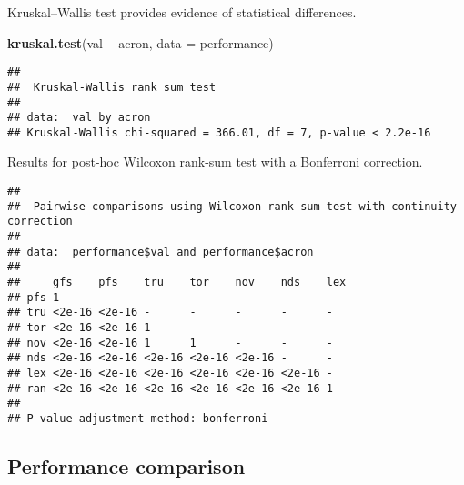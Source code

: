 \documentclass[]{book}
\newenvironment{Shaded}{\begin{snugshade}}{\end{snugshade}}
\newcommand{\DataTypeTok}[1]{\textcolor[rgb]{0.13,0.29,0.53}{#1}}
\newcommand{\KeywordTok}[1]{\textcolor[rgb]{0.13,0.29,0.53}{\textbf{#1}}}
\newcommand{\NormalTok}[1]{#1}
\newcommand{\OperatorTok}[1]{\textcolor[rgb]{0.81,0.36,0.00}{\textbf{#1}}}
\newcommand{\OtherTok}[1]{\textcolor[rgb]{0.56,0.35,0.01}{#1}}
\newcommand{\StringTok}[1]{\textcolor[rgb]{0.31,0.60,0.02}{#1}}
\begin{document}
Kruskal--Wallis test provides evidence of statistical differences.

\begin{Shaded}
\begin{Highlighting}[]
\KeywordTok{kruskal.test}\NormalTok{(val }\OperatorTok{~}\StringTok{ }\NormalTok{acron, }\DataTypeTok{data =}\NormalTok{ performance)}
\end{Highlighting}
\end{Shaded}

\begin{verbatim}
## 
##  Kruskal-Wallis rank sum test
## 
## data:  val by acron
## Kruskal-Wallis chi-squared = 366.01, df = 7, p-value < 2.2e-16
\end{verbatim}

Results for post-hoc Wilcoxon rank-sum test with a Bonferroni correction.

\begin{Shaded}
\end{Shaded}

\begin{verbatim}
## 
##  Pairwise comparisons using Wilcoxon rank sum test with continuity correction 
## 
## data:  performance$val and performance$acron 
## 
##     gfs    pfs    tru    tor    nov    nds    lex
## pfs 1      -      -      -      -      -      -  
## tru <2e-16 <2e-16 -      -      -      -      -  
## tor <2e-16 <2e-16 1      -      -      -      -  
## nov <2e-16 <2e-16 1      1      -      -      -  
## nds <2e-16 <2e-16 <2e-16 <2e-16 <2e-16 -      -  
## lex <2e-16 <2e-16 <2e-16 <2e-16 <2e-16 <2e-16 -  
## ran <2e-16 <2e-16 <2e-16 <2e-16 <2e-16 <2e-16 1  
## 
## P value adjustment method: bonferroni
\end{verbatim}

\hypertarget{performance-comparison}{%
\subsection{Performance comparison}\label{performance-comparison}}
\end{document}
